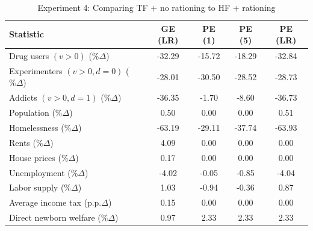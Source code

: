 \begin{table}[htbp]
\centering
\caption{Experiment 4: Comparing TF + no rationing to HF + rationing}
\label{tab:experiment_4}
\setlength{\tabcolsep}{5pt}
\renewcommand{\arraystretch}{1.15}
\begin{tabular}{lcccc}
\toprule
Statistic 
& GE (LR)
& PE (1) 
& PE (5) 
& PE (LR) \\
\midrule
Drug users $(v>0)$ ($\%\Delta$)                    & -32.29 & -15.72 & -18.29 & -32.84 \\
Experimenters $(v>0, d=0)$ ($\%\Delta$)            & -28.01 & -30.50 & -28.52 & -28.73 \\
Addicts $(v>0, d=1)$ ($\%\Delta$)                  & -36.35 &  -1.70 &  -8.60 & -36.73 \\
Population ($\%\Delta$)                            &   0.50 &   0.00 &   0.00 &   0.51 \\
Homelessness ($\%\Delta$)                          & -63.19 & -29.11 & -37.74 & -63.93 \\
Rents ($\%\Delta$)                                 &   4.09 &   0.00 &   0.00 &   0.00 \\
House prices ($\%\Delta$)                          &   0.17 &   0.00 &   0.00 &   0.00 \\
Unemployment ($\%\Delta$)                          &  -4.02 &  -0.05 &  -0.85 &  -4.04 \\
Labor supply ($\%\Delta$)                          &   1.03 &  -0.94 &  -0.36 &   0.87 \\
Average income tax (p.p.$\Delta$)                  &   0.15 &  0.00 &  0.00 &   0.00 \\
Direct newborn welfare ($\%\Delta$)                &   0.97 &   2.33 &   2.33 &   2.33 \\
\bottomrule
\bottomrule
\end{tabular}
\end{table}
